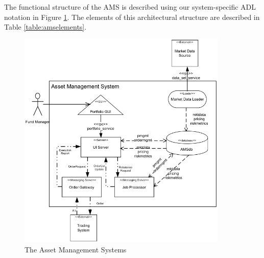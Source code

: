   The functional structure of the AMS is described using our system-specific ADL 
notation in Figure \ref{figure:amsdiagram}.  The elements of this architectural structure are described in Table \ref{table:amselements}. 

\begin{figure}
\centering
\includegraphics[width=10cm]{Figures/adls-figure4}
\caption{The Asset Management Systems}
\label{figure:amsdiagram}
\end{figure}  
  
